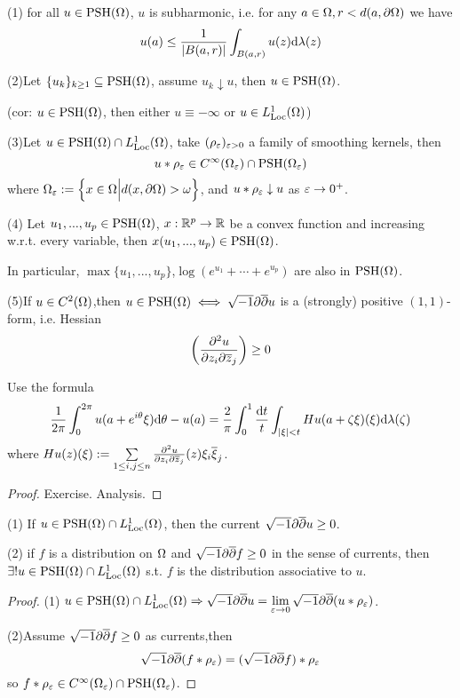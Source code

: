 \begin{prop}
(1) for all $u\in\operatorname{PSH}(\Omega)$, $u$ is subharmonic, i.e.
for any $a\in\Omega,r<d(a,\partial\Omega)$ we have
$$
  u(a)\leq\frac{1}{|B(a,r)|}
  \int_{B(a,r)}u(z)\mathrm{d}\lambda(z)
$$

(2)Let $\{u_k\}_{k\geq 1}\subseteq\operatorname{PSH}(\Omega)$,
assume $u_k\downarrow u$, then $u\in\operatorname{PSH}(\Omega)$.

(cor: $u\in\operatorname{PSH}(\Omega)$, then either $u\equiv-\infty$ or $u\in L^1_{\operatorname{Loc}}(\Omega)$)

(3)Let $u\in\operatorname{PSH}(\Omega)\cap L^1_{\operatorname{Loc}}(\Omega)$,
take $(\rho_\varepsilon)_{\varepsilon>0}$ a family of smoothing kernels,
then
$$u*\rho_\varepsilon\in C^{\infty}(\Omega_\varepsilon)\cap\operatorname{PSH}(\Omega_\varepsilon)$$
where $\Omega_\varepsilon:=\Big\{ x\in\Omega \Big| d(x,\partial\Omega)>\omega \Big\}$,
and $u*\rho_\varepsilon\downarrow u$ as $\varepsilon\to 0^+$.

(4) Let $u_1,...,u_p\in\operatorname{PSH}(\Omega)$,
$x:\mathbb{R}^p\to \mathbb{R}$ be a convex function and increasing w.r.t. every variable,
then $x(u_1,...,u_p)\in\operatorname{PSH}(\Omega)$.

In particular, $\max\{u_1,...,u_p\}$,$\log(e^{u_1}+\cdots+e^{u_p})$
are also in $\operatorname{PSH}(\Omega)$.

(5)If $u\in C^2(\Omega)$,then $u\in\operatorname{PSH}(\Omega)\iff\sqrt{-1}\partial\overline{\partial} u$
is a (strongly) positive $(1,1)$-form, i.e. Hessian
$$\left(\frac{\partial^2{u}} {\partial{z_i}\partial{\overline{z}_j}}\right)\geq 0$$
\end{prop}

Use the formula
$$
  \frac{1}{2\pi}
  \int_{0}^{2\pi}
    u(a+e^{i\theta}\xi)\mathrm{d}\theta-u(a)
=
  \frac{2}{\pi}
  \int_{0}^{1}\frac{\mathrm{d} t}{t}
  \int_{|\xi|<t}
    Hu(a+\zeta\xi)(\xi)\mathrm{d}\lambda(\zeta)
$$
where $Hu(z)(\xi):=\sum\limits_{1\leq i,j\leq n}
\frac{\partial^2{u}} {\partial{z_i}\partial{\overline{z}_j}}(z)\xi_i\overline{\xi}_j$.

\begin{proof}
Exercise. Analysis.
\end{proof}

\begin{thm}
(1) If $u\in\operatorname{PSH}(\Omega)\cap L_{\operatorname{Loc}}^1(\Omega)$,
then the current $\sqrt{-1}\partial\overline{\partial} u\geq 0$.

(2) if $f$ is a distribution on $\Omega$ and $\sqrt{-1}\partial\overline{\partial} f\geq 0$
in the sense of currents, then $\exists !u\in\operatorname{PSH}(\Omega)\cap L^1_{\operatorname{Loc}}(\Omega)$
s.t. $f$ is the distribution associative to $u$.
\end{thm}

\begin{proof}
(1) $u\in\operatorname{PSH}(\Omega)\cap L_{\operatorname{Loc}}^1(\Omega)
\Rightarrow\sqrt{-1}\partial\overline{\partial} u=\lim\limits_{\varepsilon\to 0}\sqrt{-1}\partial\overline{\partial}(u*\rho_\varepsilon)$.

(2)Assume $\sqrt{-1}\partial\overline{\partial} f\geq 0$ as currents,then
$$
  \sqrt{-1}\partial\overline{\partial}(f*\rho_\varepsilon)
=
  (\sqrt{-1}\partial\overline{\partial} f)*\rho_\varepsilon
$$
so $f*\rho_\varepsilon\in C^\infty(\Omega_\varepsilon)\cap\operatorname{PSH}(\Omega_\varepsilon)$.
\end{proof}

